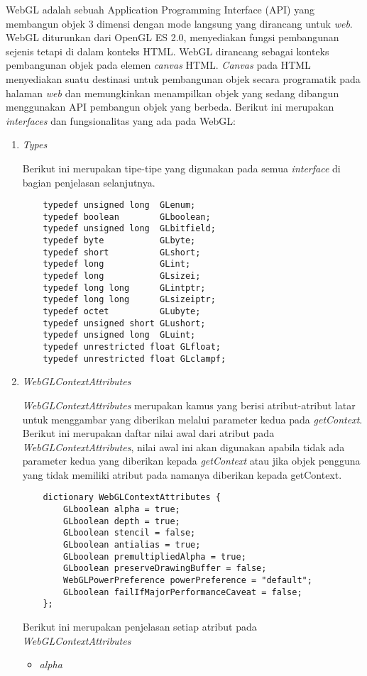 WebGL adalah sebuah Application Programming Interface (API) yang membangun objek 3 dimensi dengan mode langsung yang dirancang untuk {\it web}. WebGL diturunkan dari OpenGL ES 2.0, menyediakan fungsi pembangunan sejenis tetapi di dalam konteks HTML. WebGL dirancang sebagai konteks pembangunan objek pada elemen {\it canvas} HTML. {\it Canvas} pada HTML menyediakan suatu destinasi untuk pembangunan objek secara programatik pada halaman {\it web} dan memungkinkan menampilkan objek yang sedang dibangun menggunakan API pembangun objek yang berbeda. Berikut ini merupakan {\it interfaces} dan fungsionalitas yang ada pada WebGL:
\begin{enumerate}
\item {\it Types}

	Berikut ini merupakan tipe-tipe yang digunakan pada semua {\it interface} di bagian penjelasan selanjutnya.
	\begin{lstlisting}
	typedef unsigned long  GLenum;
	typedef boolean        GLboolean;
	typedef unsigned long  GLbitfield;
	typedef byte           GLbyte;
	typedef short          GLshort;
	typedef long           GLint;
	typedef long           GLsizei;
	typedef long long      GLintptr;
	typedef long long      GLsizeiptr;
	typedef octet          GLubyte;
	typedef unsigned short GLushort;
	typedef unsigned long  GLuint;
	typedef unrestricted float GLfloat;
	typedef unrestricted float GLclampf;
	\end{lstlisting}
	
\item {\it WebGLContextAttributes}

	{\it WebGLContextAttributes} merupakan kamus yang berisi atribut-atribut latar untuk menggambar yang diberikan melalui parameter kedua pada {\it getContext}. Berikut ini merupakan daftar nilai awal dari atribut pada {\it WebGLContextAttributes}, nilai awal ini akan digunakan apabila tidak ada parameter kedua yang diberikan kepada {\it getContext} atau jika objek pengguna yang tidak memiliki atribut pada namanya diberikan kepada getContext.
	\begin{lstlisting}
	dictionary WebGLContextAttributes {
    	GLboolean alpha = true;
    	GLboolean depth = true;
    	GLboolean stencil = false;
    	GLboolean antialias = true;
    	GLboolean premultipliedAlpha = true;
    	GLboolean preserveDrawingBuffer = false;
    	WebGLPowerPreference powerPreference = "default";
    	GLboolean failIfMajorPerformanceCaveat = false;
	};
	\end{lstlisting}
	Berikut ini merupakan penjelasan setiap atribut pada {\it WebGLContextAttributes} 
	\begin{itemize}
	\item {\it alpha}
	

\end{itemize}
\end{enumerate}
